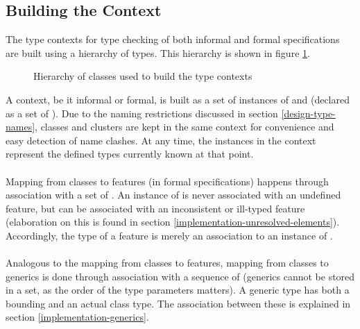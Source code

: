 \subsection{Building the Context}
\label{implementation-context-class-structure}
The type contexts for type checking of both informal and formal specifications are built using a hierarchy of types. This hierarchy is shown in figure \ref{fig:context-classes}.
\begin{figure}[H]
    \centerline{}
    \caption[Context classes]{Hierarchy of classes used to build the type contexts}
    \label{fig:context-classes}
\end{figure}
A context, be it informal or formal, is built as a set of instances of \tbonclasstype   and \tbonclustertype   (declared as a set of \tbontype ). Due to the naming restrictions discussed in section \ref{design-type-names}, classes and clusters are kept in the same context for convenience and easy detection of name clashes. At any time, the instances in the context represent the defined types currently known at that point.
\paragraph{} Mapping from classes to features (in formal specifications) happens through association with a set of \tbonfeature . An instance of \tbonclasstype  is never associated with an undefined feature, but can be associated with an inconsistent or ill-typed feature (elaboration on this is found in section \ref{implementation-unresolved-elements}). Accordingly, the type of a feature is merely an association to an instance of \tbonclasstype .
\paragraph{} Analogous to the mapping from classes to features, mapping from classes to generics is done through association with a sequence of \tbongeneric  (generics cannot be stored in a set, as the order of the type parameters matters). A generic type has both a bounding and an actual class type. The association between these is explained in section \ref{implementation-generics}.


